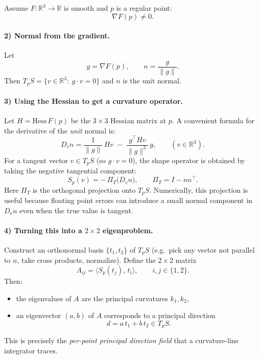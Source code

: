\documentclass[12pt,a4paper]{article}
\theoremstyle{plain}
\theoremstyle{definition}      %
\begin{document}
Assume $F:\mathbb{R}^3\to\mathbb{R}$ is smooth and $p$ is a regular point:
\[
\nabla F(p)\neq 0.
\]

\paragraph{2) Normal from the gradient.}
Let
\[
g=\nabla F(p),
\qquad 
n=\frac{g}{\|g\|}.
\]
Then $T_pS=\{v\in\mathbb{R}^3:\ g\cdot v=0\}$ and $n$ is the unit normal.

\paragraph{3) Using the Hessian to get a curvature operator.}
Let $H=\mathrm{Hess}\,F(p)$ be the $3\times 3$ Hessian matrix at $p$.
A convenient formula for the derivative of the \emph{unit} normal is:
\[
D_v n
=
\frac{1}{\|g\|}\,H v
\;-\;
\frac{g^\top H v}{\|g\|^{3}}\,g,
\qquad (v\in\mathbb{R}^3).
\]
For a tangent vector $v\in T_pS$ (so $g\cdot v=0$), the shape operator is obtained by
taking the negative tangential component:
\[
S_p(v)= -\,\Pi_T\!\bigl(D_v n\bigr),
\qquad 
\Pi_T = I - n n^\top.
\]
\noindent
Here $\Pi_T$ is the orthogonal projection onto $T_pS$. Numerically, this projection is useful because
floating point errors can introduce a small normal component in $D_v n$ even when the true value is tangent.

\paragraph{4) Turning this into a $2\times 2$ eigenproblem.}
Construct an orthonormal basis $\{t_1,t_2\}$ of $T_pS$ (e.g.\ pick any vector not parallel to $n$,
take cross products, normalize).
Define the $2\times 2$ matrix
\[
A_{ij}=\bigl\langle S_p(t_j),\,t_i\bigr\rangle,
\qquad i,j\in\{1,2\}.
\]
Then:
\begin{itemize}
	\item the eigenvalues of $A$ are the principal curvatures $k_1,k_2$,
	\item an eigenvector $(a,b)$ of $A$ corresponds to a principal direction
	\[
	d = a\,t_1 + b\,t_2 \in T_pS.
	\]
\end{itemize}
This is precisely the \emph{per-point principal direction field} that a curvature-line integrator traces.

\end{document}
